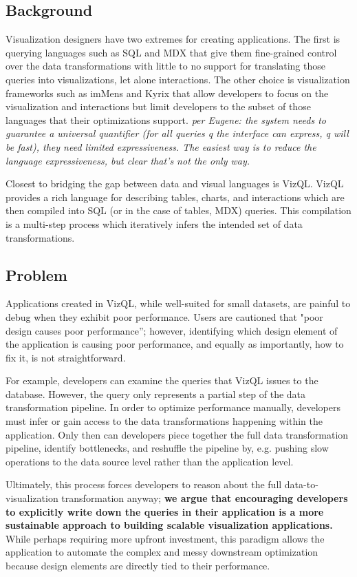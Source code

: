 \subsection{Background} Visualization designers have two extremes for creating applications. The first is querying languages such as SQL and MDX that give them fine-grained control over the data transformations with little to no support for translating those queries into visualizations, let alone interactions. The other choice is visualization frameworks such as imMens and Kyrix that allow developers to focus on the visualization and interactions but limit developers to the subset of those languages that their optimizations support. \textit{per Eugene: the system needs to guarantee a universal quantifier (for all queries q the interface can express, q will be fast), they need limited expressiveness.  The easiest way is to reduce the language expressiveness, but clear that's not the only way.}

Closest to bridging the gap between data and visual languages is VizQL. VizQL provides a rich language for describing tables, charts, and interactions which are then compiled into SQL (or in the case of tables, MDX) queries. This compilation is a multi-step process which iteratively infers the intended set of data transformations. 

\subsection{Problem}
Applications created in VizQL, while well-suited for small datasets, are painful to debug when they exhibit poor performance. Users are cautioned that "poor design causes poor performance''; however, identifying which design element of the application is causing poor performance, and equally as importantly, how to fix it, is not straightforward. 

For example, developers can examine the queries that VizQL issues to the database. However, the query only represents a partial step of the data transformation pipeline. In order to optimize performance manually, developers must infer or gain access to the data transformations happening within the application. Only then can developers piece together the full data transformation pipeline, identify bottlenecks, and reshuffle the pipeline by, e.g. pushing slow operations to the data source level rather than the application level. 

Ultimately, this process forces developers to reason about the full data-to-visualization transformation anyway; \textbf{we argue that encouraging developers to explicitly write down the queries in their application is a more sustainable approach to building scalable visualization applications.} While perhaps requiring more upfront investment, this paradigm allows the application to automate the complex and messy downstream optimization because design elements are directly tied to their performance. 

